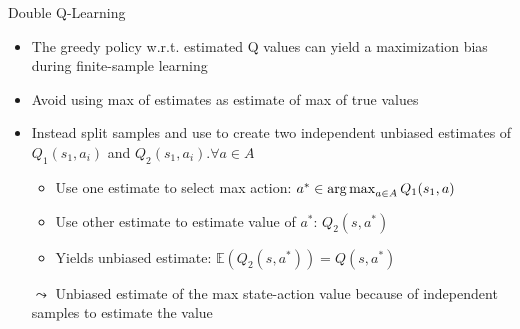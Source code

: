\begin{frame}[c]{Double Q-Learning}	
	
	\begin{itemize}
		\item The greedy policy w.r.t. estimated Q values can yield a maximization
		bias during finite-sample learning
		\item Avoid using max of estimates as estimate of max of true values
		\item Instead split samples and use to create two independent unbiased
		estimates of $Q_1(s_1, a_i)$ and $Q_2(s_1, a_i). \forall a\in A$
		\begin{itemize}
			\item Use one estimate to select max action: $a^* \in \operatorname*{arg\,max}_{a \in A} Q_1(s_1, a)$
			\item Use other estimate to estimate value of $a^*$: $Q_2(s,a^*)$
			\item Yields unbiased estimate: $\mathbb{E}(Q_2(s,a^*)) = Q(s,a^*)$
		\end{itemize}
		\item[$\leadsto$] Unbiased estimate of the max state-action value because of independent samples to estimate the value
	\end{itemize}

	
\end{frame}
